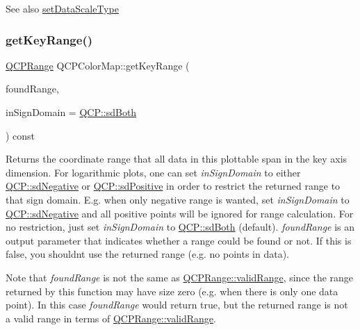 \begin{DoxySeeAlso}{See also}
\hyperlink{classQCPColorMap_a9d20aa08e3c1f20f22908c45b9c06511}{set\+Data\+Scale\+Type} 
\end{DoxySeeAlso}
\mbox{\label{classQCPColorMap_a985861974560f950af6cb7fae8c46267}} 
\subsubsection{\texorpdfstring{get\+Key\+Range()}{getKeyRange()}}
{\footnotesize\ttfamily \hyperlink{classQCPRange}{Q\+C\+P\+Range} Q\+C\+P\+Color\+Map\+::get\+Key\+Range (\begin{DoxyParamCaption}\item[{bool \&}]{found\+Range,  }\item[{\hyperlink{namespaceQCP_afd50e7cf431af385614987d8553ff8a9}{Q\+C\+P\+::\+Sign\+Domain}}]{in\+Sign\+Domain = {\ttfamily \hyperlink{namespaceQCP_afd50e7cf431af385614987d8553ff8a9aa38352ef02d51ddfa4399d9551566e24}{Q\+C\+P\+::sd\+Both}} }\end{DoxyParamCaption}) const\hspace{0.3cm}{\ttfamily [virtual]}}

Returns the coordinate range that all data in this plottable span in the key axis dimension. For logarithmic plots, one can set {\itshape in\+Sign\+Domain} to either \hyperlink{namespaceQCP_afd50e7cf431af385614987d8553ff8a9a2d18af0bc58f6528d1e82ce699fe4829}{Q\+C\+P\+::sd\+Negative} or \hyperlink{namespaceQCP_afd50e7cf431af385614987d8553ff8a9a584784b75fb816abcc627cf743bb699f}{Q\+C\+P\+::sd\+Positive} in order to restrict the returned range to that sign domain. E.\+g. when only negative range is wanted, set {\itshape in\+Sign\+Domain} to \hyperlink{namespaceQCP_afd50e7cf431af385614987d8553ff8a9a2d18af0bc58f6528d1e82ce699fe4829}{Q\+C\+P\+::sd\+Negative} and all positive points will be ignored for range calculation. For no restriction, just set {\itshape in\+Sign\+Domain} to \hyperlink{namespaceQCP_afd50e7cf431af385614987d8553ff8a9aa38352ef02d51ddfa4399d9551566e24}{Q\+C\+P\+::sd\+Both} (default). {\itshape found\+Range} is an output parameter that indicates whether a range could be found or not. If this is false, you shouldn\textquotesingle{}t use the returned range (e.\+g. no points in data).

Note that {\itshape found\+Range} is not the same as \hyperlink{classQCPRange_ab38bd4841c77c7bb86c9eea0f142dcc0}{Q\+C\+P\+Range\+::valid\+Range}, since the range returned by this function may have size zero (e.\+g. when there is only one data point). In this case {\itshape found\+Range} would return true, but the returned range is not a valid range in terms of \hyperlink{classQCPRange_ab38bd4841c77c7bb86c9eea0f142dcc0}{Q\+C\+P\+Range\+::valid\+Range}.

